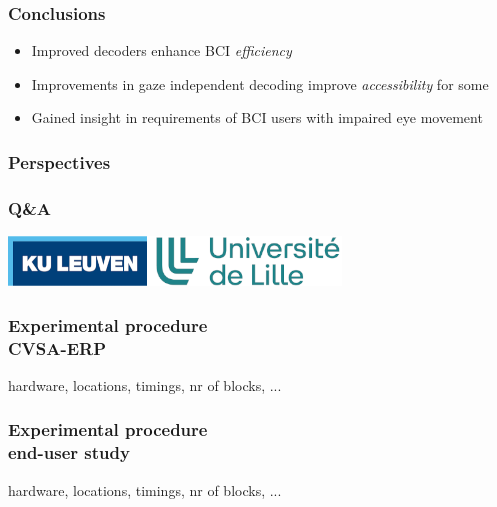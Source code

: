 \documentclass{kul-ulille-beamer}
\begin{document}
\begin{frame}
    \frametitle{Conclusions}
    \begin{changemargin}
    \begin{itemize}
      \item Improved decoders enhance BCI \emph{efficiency}
      \bigskip
      \item Improvements in gaze independent decoding improve
        \emph{accessibility} for some
      \bigskip
      \item Gained insight in requirements of BCI users with impaired eye movement
    \end{itemize}
  \end{changemargin}
\end{frame}

\begin{frame}
  \frametitle{Perspectives}
\end{frame}

{

\begin{frame}[b]
  \frametitle{Q\&A}
  \hfill \includegraphics[width=.2\textwidth]{figures/logos/logo.png}

\end{frame}
}
%



\begin{frame}[noframenumbering]
  \frametitle{Experimental procedure \\ CVSA-ERP}
  hardware, locations, timings, nr of blocks, ...
\end{frame}
\begin{frame}
  \frametitle{Experimental procedure \\ end-user study}
  hardware, locations, timings, nr of blocks, ...
\end{frame}
\end{document}
